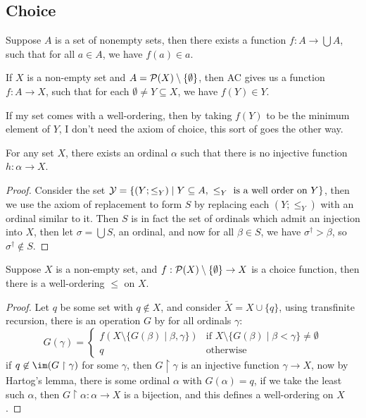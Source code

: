 \documentclass{article}
\begin{document}
\subsection{Choice}

\begin{axiom}[Choice]
    Suppose $A$ is a set of nonempty sets, then there exists a function $f:A\rightarrow \bigcup A$, such that for all $a\in A$, we have $f(a)\in a$.
\end{axiom}

If $X$ is a non-empty set and $A = \mathcal{P}(X)\setminus \{\emptyset\}$, then AC gives us a function $f:A\rightarrow X$, such that for each $\emptyset\neq Y \subseteq X$, we have $f(Y)\in Y$.

If my set comes with a well-ordering, then by taking $f(Y)$ to be the minimum element of $Y$, I don't need the axiom of choice, this sort of goes the other way.

\begin{theorem}
    For any set $X$, there exists an ordinal $\alpha$ such that there is no injective function $h:\alpha\rightarrow X$.
    \begin{proof}
        Consider the set $\mathcal{Y} = \{(Y;\leq_Y) \mid Y \subseteq A, \ \leq_Y\text{ is a well order on $Y$}\}$, then we use the axiom of replacement to form $S$ by replacing each $(Y;\leq_Y)$ with an ordinal similar to it. Then $S$ is in fact the set of ordinals which admit an injection into $X$, then let $\sigma = \bigcup S$, an ordinal, and now for all $\beta \in S$, we have $\sigma^\dagger > \beta$, so $\sigma^\dagger\not\in S$.
    \end{proof}
\end{theorem}

\begin{theorem}
    Suppose $X$ is a non-empty set, and $f:\mathcal{P}(X)\setminus\{\emptyset\} \rightarrow X$ is a choice function, then there is a well-ordering $\leq$ on $X$.
    \begin{proof}
        Let $q$ be some set with $q\not\in X$, and consider $\tilde{X} = X\cup \{q\}$, using transfinite recursion, there is an operation $G$ by for all ordinals $\gamma$: \[
        G(\gamma) = \begin{cases}
            f(X\setminus \{G(\beta) \mid \beta , \gamma\}) & \text{if $X\setminus\{G(\beta) \mid \beta < \gamma\}\neq \emptyset$} \\
            q & \text{otherwise}
        \end{cases}
        \] if  $q\not\in \im(G\restriction \gamma)$ for some $\gamma$, then $G\restriction \gamma$ is an injective function $\gamma\rightarrow X$, now by Hartog's lemma, there is some ordinal $\alpha$ with $G(\alpha) = q$, if we take the least such $\alpha$, then $G\restriction \alpha : \alpha \rightarrow X$ is a bijection, and this defines a well-ordering on $X$.
    \end{proof}
\end{theorem}
\end{document}
